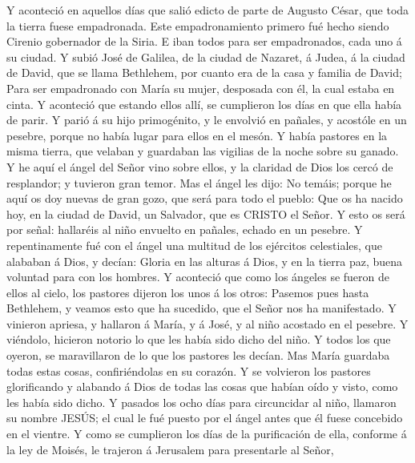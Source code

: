 Y aconteció en aquellos días que salió edicto de parte de
Augusto César, que toda la tierra fuese empadronada.  Este
empadronamiento primero fué hecho siendo Cirenio gobernador de la Siria.
 E iban todos para ser empadronados, cada uno á su ciudad.
 Y subió José de Galilea, de la ciudad de Nazaret, á Judea,
á la ciudad de David, que se llama Bethlehem, por cuanto era de la casa
y familia de David;  Para ser empadronado con María su
mujer, desposada con él, la cual estaba en cinta.  Y
aconteció que estando ellos allí, se cumplieron los días en que ella
había de parir.  Y parió á su hijo primogénito, y le
envolvió en pañales, y acostóle en un pesebre, porque no había lugar
para ellos en el mesón.  Y había pastores en la misma
tierra, que velaban y guardaban las vigilias de la noche sobre su
ganado.  Y he aquí el ángel del Señor vino sobre ellos, y la
claridad de Dios los cercó de resplandor; y tuvieron gran temor.
 Mas el ángel les dijo: No temáis; porque he aquí os doy
nuevas de gran gozo, que será para todo el pueblo:  Que os
ha nacido hoy, en la ciudad de David, un Salvador, que es CRISTO el
Señor.  Y esto os será por señal: hallaréis al niño
envuelto en pañales, echado en un pesebre.  Y
repentinamente fué con el ángel una multitud de los ejércitos
celestiales, que alababan á Dios, y decían:  Gloria en las
alturas á Dios, y en la tierra paz, buena voluntad para con los hombres.
 Y aconteció que como los ángeles se fueron de ellos al
cielo, los pastores dijeron los unos á los otros: Pasemos pues hasta
Bethlehem, y veamos esto que ha sucedido, que el Señor nos ha
manifestado.  Y vinieron apriesa, y hallaron á María, y á
José, y al niño acostado en el pesebre.  Y viéndolo,
hicieron notorio lo que les había sido dicho del niño.  Y
todos los que oyeron, se maravillaron de lo que los pastores les decían.
 Mas María guardaba todas estas cosas, confiriéndolas en su
corazón.  Y se volvieron los pastores glorificando y
alabando á Dios de todas las cosas que habían oído y visto, como les
había sido dicho.  Y pasados los ocho días para circuncidar
al niño, llamaron su nombre JESÚS; el cual le fué puesto por el ángel
antes que él fuese concebido en el vientre.  Y como se
cumplieron los días de la purificación de ella, conforme á la ley de
Moisés, le trajeron á Jerusalem para presentarle al Señor, 
